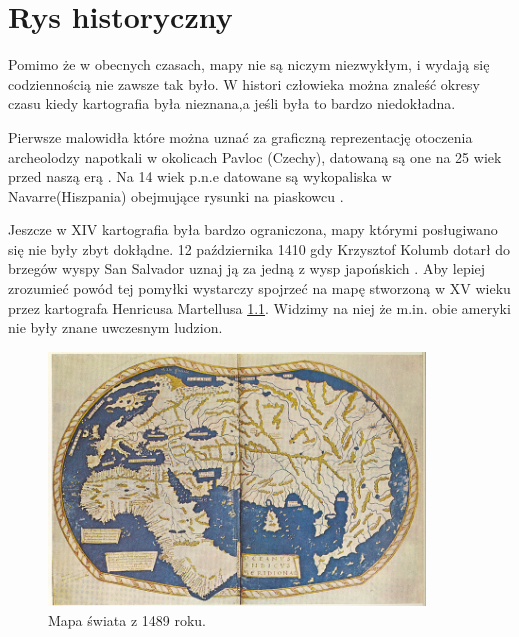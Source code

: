 
\chapter{Rys historyczny}
\label{sec:hisotryMap}

Pomimo że w obecnych czasach, mapy nie są niczym niezwykłym, i wydają się codziennością nie zawsze tak było. W histori człowieka można znaleść okresy czasu kiedy kartografia była nieznana,a jeśli była to bardzo niedokładna.

Pierwsze malowidła które można uznać za graficzną reprezentację otoczenia archeolodzy napotkali w okolicach Pavloc (Czechy), datowaną są one na 25 wiek przed naszą erą \cite{pre2} . Na 14 wiek p.n.e datowane są wykopaliska w Navarre(Hiszpania) obejmujące rysunki na piaskowcu \cite{pre1}.

Jeszcze w XIV kartografia była bardzo ograniczona, mapy którymi posługiwano się nie były zbyt dokłądne. 12 października 1410 gdy Krzysztof Kolumb dotarł do brzegów wyspy San Salvador uznaj ją za jedną z wysp japońskich \cite{columb}. Aby lepiej zrozumieć powód tej pomyłki wystarczy spojrzeć na mapę stworzoną w XV wieku przez kartografa Henricusa Martellusa \ref{fig:worldMap1}. Widzimy na niej że m.in. obie ameryki nie były znane uwczesnym ludzion.

\begin{figure}[H]
  \centering
    \includegraphics[width=100mm]{ge/worldMap1.jpg}
  \caption{Mapa świata z 1489 roku.}
  \label{fig:worldMap1}
\end{figure}